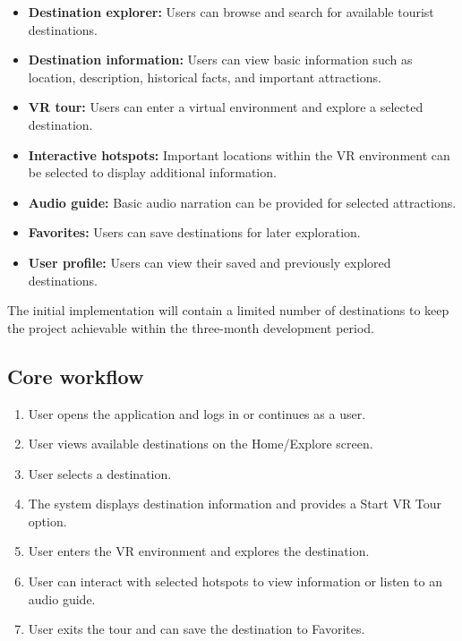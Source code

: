 \documentclass[11pt,a4paper]{article}
\begin{document}
\begin{itemize}[leftmargin=0.7cm]
    \item \textbf{Destination explorer:} Users can browse and search for available tourist destinations.
    \item \textbf{Destination information:} Users can view basic information such as location, description, historical facts, and important attractions.
    \item \textbf{VR tour:} Users can enter a virtual environment and explore a selected destination.
    \item \textbf{Interactive hotspots:} Important locations within the VR environment can be selected to display additional information.
    \item \textbf{Audio guide:} Basic audio narration can be provided for selected attractions.
    \item \textbf{Favorites:} Users can save destinations for later exploration.
    \item \textbf{User profile:} Users can view their saved and previously explored destinations.
\end{itemize}

The initial implementation will contain a limited number of destinations to keep the project
achievable within the three-month development period.

\subsection{Core workflow}

\begin{enumerate}[leftmargin=0.7cm]
    \item User opens the application and logs in or continues as a user.
    \item User views available destinations on the Home/Explore screen.
    \item User selects a destination.
    \item The system displays destination information and provides a Start VR Tour option.
    \item User enters the VR environment and explores the destination.
    \item User can interact with selected hotspots to view information or listen to an audio guide.
    \item User exits the tour and can save the destination to Favorites.
\end{enumerate}
\end{document}
